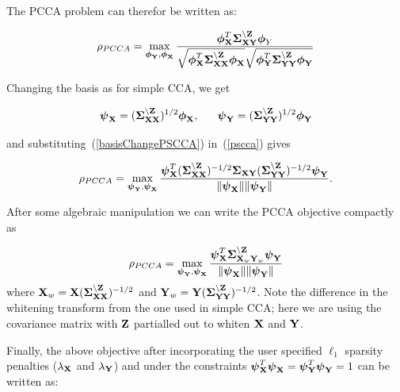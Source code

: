 \documentclass{llncs}
\newcommand{\X}{{\bf X}}
\newcommand{\Y}{{\bf Y}}
\newcommand{\Z}{{\bf Z}}
\newcommand{\bs}{\boldsymbol}
\begin{document}


The PCCA problem can therefor be written as:

\begin{equation}
\label{pscca}
\rho_{PCCA}=\max_{{\bs\phi_{\Y}}, {\bs\phi_{\X}}} \frac{\bs\phi_{\X}^T \bs\Sigma_{\X\Y}^{\backslash \Z}\bs\phi_Y}{\sqrt{\bs\phi_{\X}^T\bs\Sigma_{\X\X}^{\backslash \Z}\bs\phi_{\X}}\sqrt{\bs\phi_{\Y}^T\bs\Sigma_{\Y\Y}^{\backslash \Z}\bs\phi_{\Y}}}
\end{equation}


Changing the basis as for simple CCA, we get

\begin{equation}
\label{basisChangePSCCA}
\bs\psi_{\X} = (\bs\Sigma_{\X\X}^{\backslash \Z})^{1/2}\bs\phi_{\X}, \;\;\;\;\;\;   \bs\psi_{\Y} = (\bs\Sigma_{\Y\Y}^{\backslash \Z})^{1/2}\bs\phi_{\Y} 
\end{equation}

and substituting~(\ref{basisChangePSCCA}) in~(\ref{pscca}) gives

\begin{equation}
\label{subsPSCCA}
\rho_{PCCA}= \max_{{\bs\psi_{\Y}}, {\bs\psi_{\X}}} \frac{\bs\psi_{\X}^T (\bs\Sigma_{\X\X}^{\backslash \Z})^{-1/2}\bs\Sigma_{\X\Y}(\bs\Sigma_{\Y\Y}^{\backslash \Z})^{-1/2}\bs\psi_{\Y}}{\|\bs\psi_{\X}\| \|\bs\psi_{\Y}\|} .
\end{equation}

After some algebraic manipulation we can write the PCCA objective compactly as

\begin{equation}
\label{psccacompact}
\rho_{PCCA}=\max_{{\bs\psi_{\Y}}, {\bs\psi_{\X}}} \frac{\bs\psi_{\X}^T \bs\Sigma_{\X_w\Y_w}^{\backslash \Z}\bs\psi_{\Y}}{\|\bs\psi_{\X}\| \|\bs\psi_{\Y}\|}
\end{equation}
where $\X_w=\X(\bs\Sigma_{\X\X}^{\backslash \Z})^{-1/2}$ and
$\Y_w=\Y(\bs\Sigma_{\Y\Y}^{\backslash \Z})^{-1/2}$. Note the
difference in the whitening transform from the one used in simple CCA;
here we are using the covariance matrix with $\Z$ partialled out
to whiten $\X$ and $\Y$.


Finally, the above objective after incorporating the user specified $\ell_1$ sparsity penalties ($\lambda_{\X}$ and $\lambda_{\Y}$) and under the constraints $\bs\psi_{\X}^T\bs\psi_{\X}=\bs\psi_{\Y}^T\bs\psi_{\Y}=1$ can be written as:
\end{document}
